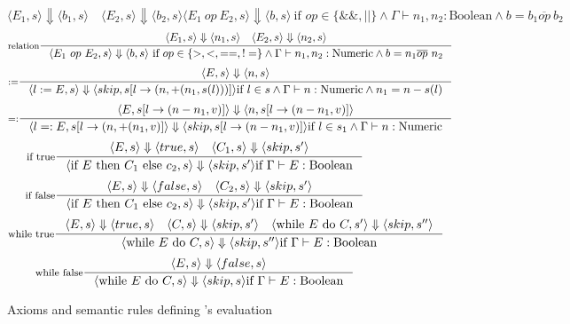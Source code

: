 \begin{figure}[hbt!]
\[{        \langle E_1, s \rangle \Downarrow \langle b_1, s \rangle \quad \langle E_2, s \rangle \Downarrow \langle b_2, s \rangle
        }{
        \langle E_1\ op\ E_2, s \rangle \Downarrow \langle b, s \rangle\ \text{if } op \in \{\&\&, || \} \land \Gamma \vdash n_1, n_2 : \text{Boolean} \land b = b_1 \overline{op}\ b_2
        }
    \]
    \vspace{0.2cm}
    \[
        \inference[relation]{
        \langle E_1, s \rangle \Downarrow \langle n_1, s \rangle \quad \langle E_2, s \rangle \Downarrow \langle n_2, s \rangle
        }{
        \langle E_1\ op\ E_2, s \rangle \Downarrow \langle b, s \rangle\ \text{if } op \in \{>, <, ==, != \} \land \Gamma \vdash n_1, n_2 : \text{Numeric} \land b = n_1 \overline{op}\ n_2
        }
    \]
    \vspace{0.2cm}
    \[
        \inference[:=]{
        \langle E, s \rangle \Downarrow \langle n, s \rangle
        }{
        \langle l := E, s \rangle \Downarrow \langle skip, s[l \to (n, +(n_1, s(l)))] \rangle \text{if } l \in s \land \Gamma \vdash n : \text{Numeric} \land n_1 = n - s(l)
        }
    \]
    \vspace{0.2cm}
    \[
        \inference[=:]{
        \langle E, s[l \to (n - n_1, v)] \rangle \Downarrow \langle n, s[l \to (n - n_1, v)] \rangle
        }{
        \langle l =: E, s[l \to (n, +(n_1, v)] \rangle \Downarrow \langle skip, s[l \to (n - n_1, v)] \rangle \text{if } l \in s_1 \land \Gamma \vdash n : \text{Numeric}
        }
    \]
    \vspace{0.2cm}
    \[
        \inference[if true]{
        \langle E, s \rangle \Downarrow \langle true, s \rangle \quad \langle C_1, s \rangle \Downarrow \langle skip, s' \rangle
        }{
        \langle \text{if } E \text{ then } C_1 \text{ else } c_2, s \rangle \Downarrow \langle skip, s' \rangle \text{if } \Gamma \vdash E : \text{Boolean}
        }
    \]
    \vspace{0.2cm}
    \[
        \inference[if false]{
        \langle E, s \rangle \Downarrow \langle false, s \rangle \quad \langle C_2, s \rangle \Downarrow \langle skip, s' \rangle
        }{
        \langle \text{if } E \text{ then } C_1 \text{ else } c_2, s \rangle \Downarrow \langle skip, s' \rangle \text{if } \Gamma \vdash E : \text{Boolean}
        }
    \]
    \vspace{0.2cm}
    \[
        \inference[while true]{
        \langle E, s \rangle \Downarrow \langle true, s \rangle \quad \langle C, s \rangle \Downarrow \langle skip, s' \rangle \quad \langle \text{while } E \text{ do } C, s' \rangle \Downarrow \langle skip, s'' \rangle
        }{
        \langle \text{while } E \text{ do } C, s \rangle \Downarrow \langle skip, s'' \rangle \text{if } \Gamma \vdash E : \text{Boolean}
        }
    \]
    \vspace{0.2cm}
    \[
        \inference[while false]{
        \langle E, s \rangle \Downarrow \langle false, s \rangle
        }{
        \langle \text{while } E \text{ do } C, s \rangle \Downarrow \langle skip, s \rangle \text{if } \Gamma \vdash E : \text{Boolean}
        }
    \]
    \caption{Axioms and semantic rules defining \rimp's evaluation}
    \label{fig:semantic-system}
\end{figure}

